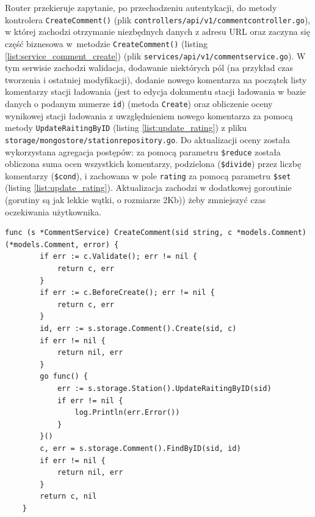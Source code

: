 Router przekieruje zapytanie, po przechodzeniu autentykacji, do metody kontrolera \texttt{CreateComment()} (plik \texttt{controllers/api/v1/commentcontroller.go}), w której zachodzi otrzymanie niezbędnych danych z adresu URL oraz zaczyna się część biznesowa w~metodzie \texttt{CreateComment()} (listing \ref{list:service_comment_create}) (plik \texttt{services/api/v1/commentservice.go}).
W tym serwisie zachodzi walidacja, dodawanie niektórych pól (na przykład czas tworzenia i ostatniej modyfikacji), dodanie nowego komentarza na początek listy komentarzy stacji ładowania (jest to edycja dokumentu stacji ładowania w bazie danych o podanym numerze \texttt{id}) (metoda \texttt{Create}) oraz obliczenie oceny wynikowej stacji ładowania z uwzględnieniem nowego komentarza za pomocą metody \texttt{UpdateRaitingByID} (listing \ref{list:update_rating}) z pliku \texttt{storage/mongostore/stationrepository.go}.
Do aktualizacji oceny została wykorzystana agregacja postępów: za pomocą parametru \texttt{\$reduce} została obliczona suma ocen wszystkich komentarzy, podzielona (\texttt{\$divide}) przez liczbę komentarzy (\texttt{\$cond}), i zachowana w pole \texttt{rating} za pomocą parametru \texttt{\$set} (listing \ref{list:update_rating}). Aktualizacja zachodzi w dodatkowej goroutinie (gorutiny są jak lekkie wątki, o rozmiarze 2Kb)) żeby zmniejszyć czas oczekiwania użytkownika.


\begin{lstlisting}[label=list:service_comment_create,caption=Serwis tworzenia komentarza,basicstyle=\tiny\ttfamily]
    func (s *CommentService) CreateComment(sid string, c *models.Comment) (*models.Comment, error) {
        if err := c.Validate(); err != nil {
            return c, err
        }
        if err := c.BeforeCreate(); err != nil {
            return c, err
        }
        id, err := s.storage.Comment().Create(sid, c)
        if err != nil {
            return nil, err
        }
        go func() {
            err := s.storage.Station().UpdateRaitingByID(sid)
            if err != nil {
                log.Println(err.Error())
            }
        }()
        c, err = s.storage.Comment().FindByID(sid, id)
        if err != nil {
            return nil, err
        }
        return c, nil
    }
\end{lstlisting}
    
